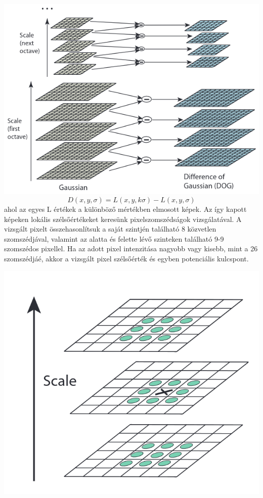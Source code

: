 \documentclass[12pt]{report}
\begin{document}
\begin{enumerate}
\begin{enumerate}
                                    \includegraphics[scale=0.5]{DOG.png}
                                    \[D(x,y,\sigma) = L(x,y,k\sigma) - L(x,y,\sigma)\]
                                    ahol az egyes L értékek a különböző mértékben elmosott képek.
                                    Az így kapott képeken lokális szélsőértékeket keresünk pixelszomszédságok vizsgálatával. A vizsgált pixelt összehasonlítsuk a saját szintjén található 8 közvetlen szomszédjával, valamint az alatta és felette lévő szinteken található  9-9 szomszédos pixellel. Ha az adott pixel intenzitása nagyobb vagy kisebb, mint a 26 szomszédjáé, akkor a vizsgált pixel szélsőérték és egyben potenciális kulcspont.\\
                                    \begin{center}
                                        \includegraphics[scale=0.3]{extrema_check.png}

\end{center}
\end{enumerate}
\end{enumerate}
\end{document}
